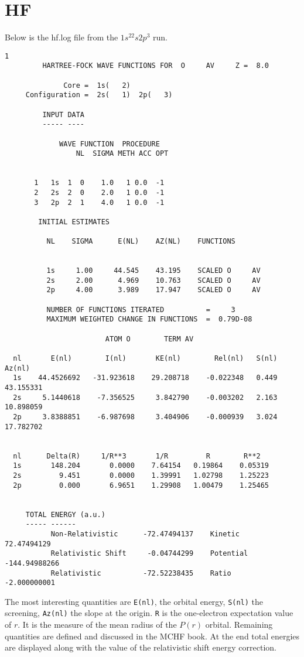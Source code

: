 \documentclass[fleqn,10pt]{book}
\begin{document}
\section{HF}
Below is the hf.log file from the $1s^22s2p^3$ run.
\begin{verbatim}
1                                                                                                                                                             
         HARTREE-FOCK WAVE FUNCTIONS FOR  O     AV     Z =  8.0 

              Core =  1s(   2)  
     Configuration =  2s(   1)  2p(   3)    

         INPUT DATA
         ----- ----

             WAVE FUNCTION  PROCEDURE
                 NL  SIGMA METH ACC OPT 


       1   1s  1  0    1.0   1 0.0  -1  
       2   2s  2  0    2.0   1 0.0  -1  
       3   2p  2  1    4.0   1 0.0  -1  

        INITIAL ESTIMATES 

          NL    SIGMA      E(NL)    AZ(NL)    FUNCTIONS


          1s     1.00     44.545    43.195    SCALED O     AV    
          2s     2.00      4.969    10.763    SCALED O     AV    
          2p     4.00      3.989    17.947    SCALED O     AV    

          NUMBER OF FUNCTIONS ITERATED          =     3   
          MAXIMUM WEIGHTED CHANGE IN FUNCTIONS  =  0.79D-08

                        ATOM O        TERM AV    

  nl       E(nl)        I(nl)       KE(nl)        Rel(nl)   S(nl)       Az(nl)
  1s    44.4526692   -31.923618    29.208718    -0.022348   0.449     43.155331
  2s     5.1440618    -7.356525     3.842790    -0.003202   2.163     10.898059
  2p     3.8388851    -6.987698     3.404906    -0.000939   3.024     17.782702


  nl      Delta(R)     1/R**3       1/R         R        R**2
  1s       148.204       0.0000    7.64154   0.19864    0.05319
  2s         9.451       0.0000    1.39991   1.02798    1.25223
  2p         0.000       6.9651    1.29908   1.00479    1.25465


     TOTAL ENERGY (a.u.)
     ----- ------
           Non-Relativistic      -72.47494137    Kinetic       72.47494129
           Relativistic Shift     -0.04744299    Potential   -144.94988266
           Relativistic          -72.52238435    Ratio        -2.000000001         
\end{verbatim}
The most interesting quantities are \verb+E(nl)+, the orbital energy, \verb+S(nl)+ the screening, \verb+Az(nl)+ the slope at the origin. \verb+R+ is the one-electron expectation value of $r$. It is the measure of the mean radius of the $P(r)$ orbital. Remaining quantities are defined and discussed in the MCHF book. At the end total energies are displayed along with the value of the relativistic shift energy correction. 
\end{document}
